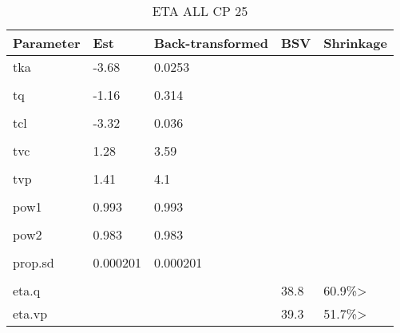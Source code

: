 \begin{table}
\centering\centering
\caption{ETA ALL CP 25}
\centering
\fontsize{8}{10}\selectfont
\begin{tabular}[t]{lllll}
\toprule
\textbf{Parameter} & \textbf{Est} & \textbf{Back-transformed} & \textbf{BSV} & \textbf{Shrinkage}\\
\midrule
tka & -3.68 & 0.0253 &  & \\
\midrule\\
tq & -1.16 & 0.314 &  & \\
\midrule\\
tcl & -3.32 & 0.036 &  & \\
\midrule\\
tvc & 1.28 & 3.59 &  & \\
\midrule\\
tvp & 1.41 & 4.1 &  & \\
\midrule\\
pow1 & 0.993 & 0.993 &  & \\
\midrule\\
pow2 & 0.983 & 0.983 &  & \\
\midrule\\
prop.sd & 0.000201 & 0.000201 &  & \\
\midrule\\
eta.q &  &  & 38.8 & 60.9\%>\\
\midrule
eta.vp &  &  & 39.3 & 51.7\%>\\
\bottomrule
\end{tabular}
\end{table}
